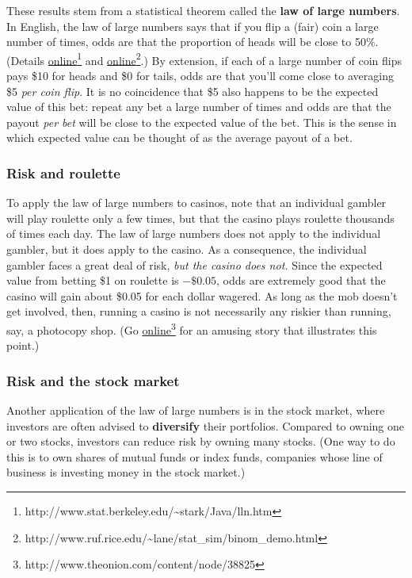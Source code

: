 These results stem from a statistical theorem called the \textbf{law of large numbers}. In English, the law of large numbers says that if you flip a (fair) coin a large number of times, odds are that the proportion of heads will be close to 50\%. (Details \href{http://www.stat.berkeley.edu/~stark/Java/lln.htm}{online}\footnote{http://www.stat.berkeley.edu/\~{}stark/Java/lln.htm} and \href{http://www.ruf.rice.edu/~lane/stat_sim/binom_demo.html}{online}\footnote{http://www.ruf.rice.edu/\~{}lane/stat\_sim/binom\_demo.html}.) %
By extension, if each of a large number of coin flips pays \$10 for heads and \$0 for tails, odds are that you'll come close to averaging \$5 \emph{per coin flip}. It is no coincidence that \$5 also happens to be the expected value of this bet: repeat any bet a large number of times and odds are that the payout \emph{per bet} will be close to the expected value of the bet. This is the sense in which expected value can be thought of as the average payout of a bet.

\subsubsection{Risk and roulette}

To apply the law of large numbers to casinos, note that an individual gambler will play roulette only a few times, but that the casino plays roulette thousands of times each day. The law of large numbers does not apply to the individual gambler, but it does apply to the casino. As a consequence, the individual gambler faces a great deal of risk, \emph{but the casino does not.} Since the expected value from betting \$1 on roulette is $-\$0.05$, odds are extremely good that the casino will gain about \$0.05 for each dollar wagered. As long as the mob doesn't get involved, then, running a casino is not necessarily any riskier than running, say, a photocopy shop. (Go \href{http://www.theonion.com/content/node/38825}{online}\footnote{http://www.theonion.com/content/node/38825} for an amusing story that illustrates this point.)

\subsubsection{Risk and the stock market}

Another application of the law of large numbers is in the stock market, where investors are often advised to \textbf{diversify} their portfolios. Compared to owning one or two stocks, investors can reduce risk by owning many stocks. (One way to do this is to own shares of mutual funds or index funds, companies whose line of business is investing money in the stock market.)

